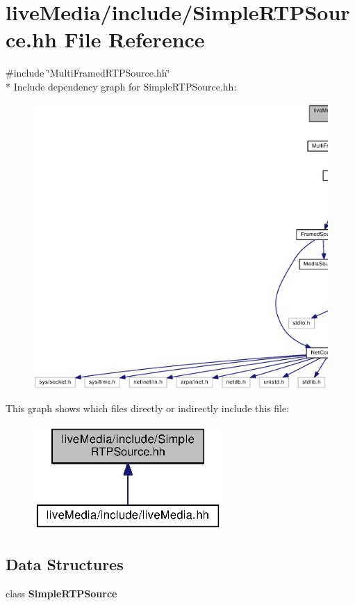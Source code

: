 \section{live\+Media/include/\+Simple\+R\+T\+P\+Source.hh File Reference}
\label{SimpleRTPSource_8hh}
{\ttfamily \#include \char`\"{}Multi\+Framed\+R\+T\+P\+Source.\+hh\char`\"{}}\\*
Include dependency graph for Simple\+R\+T\+P\+Source.\+hh\+:
\nopagebreak
\begin{figure}[H]
\begin{center}
\leavevmode
\includegraphics[width=350pt]{SimpleRTPSource_8hh__incl}
\end{center}
\end{figure}
This graph shows which files directly or indirectly include this file\+:
\nopagebreak
\begin{figure}[H]
\begin{center}
\leavevmode
\includegraphics[width=204pt]{SimpleRTPSource_8hh__dep__incl}
\end{center}
\end{figure}
\subsection*{Data Structures}
\begin{DoxyCompactItemize}
\item 
class {\bf Simple\+R\+T\+P\+Source}
\end{DoxyCompactItemize}
